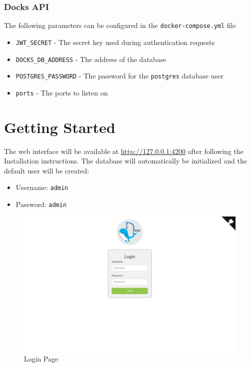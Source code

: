 \documentclass[]{article}
\providecommand{\tightlist}{%
	\setlength{\itemsep}{0pt}\setlength{\parskip}{0pt}}
\let\oldtexttt\texttt
\renewcommand{\texttt}[1]{
	\colorbox{Light}{\oldtexttt{#1}}
}
\begin{document}
\subsubsection{Docks API}
The following parameters can be configured in the \texttt{docker-compose.yml} file

\begin{itemize}
	\tightlist
	\item \texttt{JWT\_SECRET} - The secret key used during authentication requests
	\item \texttt{DOCKS\_DB\_ADDRESS} - The address of the database
	\item \texttt{POSTGRES\_PASSWORD} - The password for the \texttt{postgres} database user
	\item \texttt{ports} - The ports to listen on
\end{itemize}

\section{Getting Started}
The web interface will be available at \url{http://127.0.0.1:4200} after following the Installation instructions.
The database will automatically be initialized and the default user will
be created:
\begin{itemize}
	\tightlist
	\item Username: \texttt{admin}
	\item Password: \texttt{admin}
\end{itemize}

\begin{figure}[h!]
	\centering
	\includegraphics[scale=0.4]{login.png}
	\caption{Login Page}
\end{figure}
\end{document}
